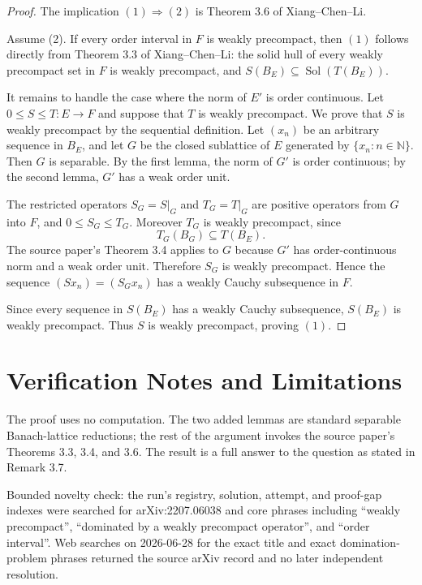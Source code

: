 \documentclass[11pt]{article}
\newcommand{\Sol}{\operatorname{Sol}}
\begin{document}
\begin{proof}
The implication $(1)\Rightarrow(2)$ is Theorem 3.6 of Xiang--Chen--Li.

Assume (2). If every order interval in $F$ is weakly precompact, then
$(1)$ follows directly from Theorem 3.3 of Xiang--Chen--Li: the solid hull
of every weakly precompact set in $F$ is weakly precompact, and
$S(B_E)\subseteq \Sol(T(B_E))$.

It remains to handle the case where the norm of $E'$ is order continuous.
Let $0\leq S\leq T:E\to F$ and suppose that $T$ is weakly precompact. We prove
that $S$ is weakly precompact by the sequential definition. Let
$(x_n)$ be an arbitrary sequence in $B_E$, and let $G$ be the closed sublattice
of $E$ generated by $\{x_n:n\in\mathbb N\}$. Then $G$ is separable. By the
first lemma, the norm of $G'$ is order continuous; by the second lemma, $G'$
has a weak order unit.

The restricted operators $S_G=S|_G$ and $T_G=T|_G$ are positive operators
from $G$ into $F$, and $0\leq S_G\leq T_G$. Moreover $T_G$ is weakly
precompact, since
\[
  T_G(B_G)\subseteq T(B_E).
\]
The source paper's Theorem 3.4 applies to $G$ because $G'$ has
order-continuous norm and a weak order unit. Therefore $S_G$ is weakly
precompact. Hence the sequence $(Sx_n)=(S_Gx_n)$ has a weakly Cauchy
subsequence in $F$.

Since every sequence in $S(B_E)$ has a weakly Cauchy subsequence, $S(B_E)$ is
weakly precompact. Thus $S$ is weakly precompact, proving $(1)$.
\end{proof}

\section*{Verification Notes and Limitations}

The proof uses no computation. The two added lemmas are standard separable
Banach-lattice reductions; the rest of the argument invokes the source
paper's Theorems 3.3, 3.4, and 3.6. The result is a full answer to the
question as stated in Remark 3.7.

Bounded novelty check: the run's registry, solution, attempt, and proof-gap
indexes were searched for arXiv:2207.06038 and core phrases including
``weakly precompact'', ``dominated by a weakly precompact operator'', and
``order interval''. Web searches on 2026-06-28 for the exact title and exact
domination-problem phrases returned the source arXiv record and no later
independent resolution.
\end{document}
